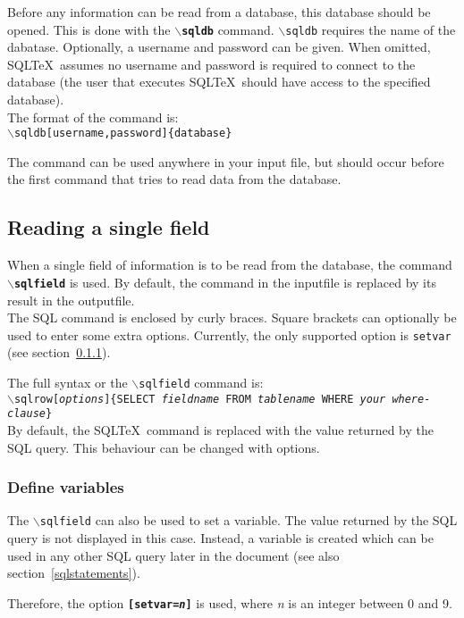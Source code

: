 \documentclass{article}
\newcommand{\bs}{\begin{math}\backslash\end{math}}
\begin{document}
Before any information can be read from a database, this database should be opened.
This is done with the \texttt{\textbf{\bs sqldb}} command.
\texttt{\bs sqldb} requires the name of the dabatase. Optionally, a username and password can be given. When
omitted, SQL\TeX\ assumes no username and password is required to connect to the database (the user that
executes SQL\TeX\ should have access to the specified database). \\
The format of the command is:\\
\texttt{\bs sqldb[username,password]\{database\}}

The command can be used anywhere in your input file, but should occur before the first command that tries to
read data from the database.

\subsection{Reading a single field}\label{sqlfield}

When a single field of information is to be read from the database, the command \texttt{\textbf{\bs sqlfield}}
is used. By default, the command in the inputfile is replaced by its result in the outputfile.\\
The SQL command is enclosed by curly braces. Square brackets can optionally be used to enter some extra options.
Currently, the only supported option is \texttt{setvar} (see section~\ref{vars}).

The full syntax or the \texttt{\bs sqlfield} command is:\\
\texttt{\bs sqlrow[\textit{options}]\{SELECT \textit{fieldname} FROM \textit{tablename} WHERE \textit{your where-clause}\}} \\
By default, the SQL\TeX\ command is replaced with the value returned by the SQL query. This behaviour
can be changed with options.


\subsubsection{Define variables}\label{vars}

The \texttt{\bs sqlfield} can also be used to set a variable. The value returned by the SQL query is not
displayed in this case. Instead, a variable is created which can be used in any other SQL query later in
the document (see also section~\ref{sqlstatements}).

Therefore, the option \texttt{\textbf{[setvar=\textit{n}]}} is used, where \textit{n} is an integer between
0 and 9.
\end{document}
